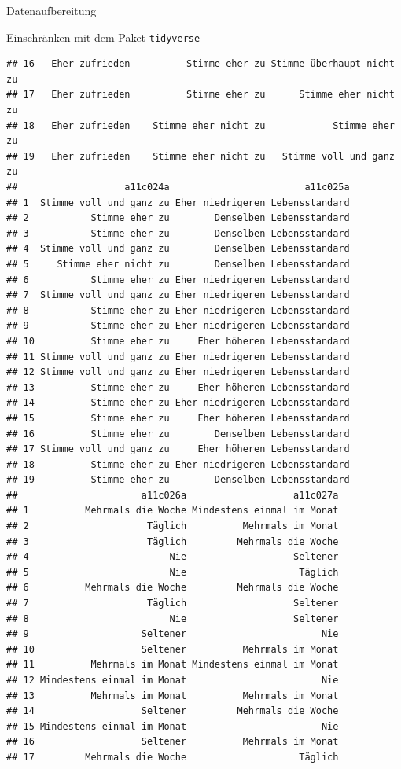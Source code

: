 \documentclass[ignorenonframetext,]{beamer}
\begin{document}
\begin{frame}[fragile]{Datenaufbereitung}
\begin{block}{Einschränken mit dem Paket \texttt{tidyverse}}
\begin{verbatim}
## 16   Eher zufrieden          Stimme eher zu Stimme überhaupt nicht zu
## 17   Eher zufrieden          Stimme eher zu      Stimme eher nicht zu
## 18   Eher zufrieden    Stimme eher nicht zu            Stimme eher zu
## 19   Eher zufrieden    Stimme eher nicht zu   Stimme voll und ganz zu
##                   a11c024a                        a11c025a
## 1  Stimme voll und ganz zu Eher niedrigeren Lebensstandard
## 2           Stimme eher zu        Denselben Lebensstandard
## 3           Stimme eher zu        Denselben Lebensstandard
## 4  Stimme voll und ganz zu        Denselben Lebensstandard
## 5     Stimme eher nicht zu        Denselben Lebensstandard
## 6           Stimme eher zu Eher niedrigeren Lebensstandard
## 7  Stimme voll und ganz zu Eher niedrigeren Lebensstandard
## 8           Stimme eher zu Eher niedrigeren Lebensstandard
## 9           Stimme eher zu Eher niedrigeren Lebensstandard
## 10          Stimme eher zu     Eher höheren Lebensstandard
## 11 Stimme voll und ganz zu Eher niedrigeren Lebensstandard
## 12 Stimme voll und ganz zu Eher niedrigeren Lebensstandard
## 13          Stimme eher zu     Eher höheren Lebensstandard
## 14          Stimme eher zu Eher niedrigeren Lebensstandard
## 15          Stimme eher zu     Eher höheren Lebensstandard
## 16          Stimme eher zu        Denselben Lebensstandard
## 17 Stimme voll und ganz zu     Eher höheren Lebensstandard
## 18          Stimme eher zu Eher niedrigeren Lebensstandard
## 19          Stimme eher zu        Denselben Lebensstandard
##                      a11c026a                   a11c027a
## 1          Mehrmals die Woche Mindestens einmal im Monat
## 2                     Täglich          Mehrmals im Monat
## 3                     Täglich         Mehrmals die Woche
## 4                         Nie                   Seltener
## 5                         Nie                    Täglich
## 6          Mehrmals die Woche         Mehrmals die Woche
## 7                     Täglich                   Seltener
## 8                         Nie                   Seltener
## 9                    Seltener                        Nie
## 10                   Seltener          Mehrmals im Monat
## 11          Mehrmals im Monat Mindestens einmal im Monat
## 12 Mindestens einmal im Monat                        Nie
## 13          Mehrmals im Monat          Mehrmals im Monat
## 14                   Seltener         Mehrmals die Woche
## 15 Mindestens einmal im Monat                        Nie
## 16                   Seltener          Mehrmals im Monat
## 17         Mehrmals die Woche                    Täglich

\end{verbatim}
\end{block}
\end{frame}
\end{document}
